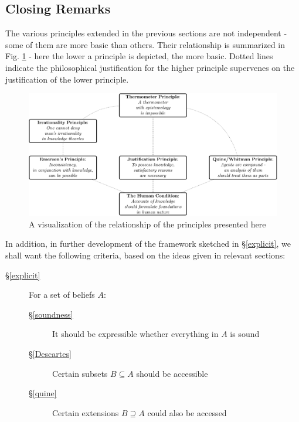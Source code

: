 \documentclass[11pt]{article}
\numberwithin{equation}{subsection}
\begin{document}
\subsection{Closing Remarks}
\label{close}
The various principles extended in the previous sections are not
independent - some of them are more basic than others.  Their
relationship is summarized in Fig. \ref{fig:principles} - here the
lower a principle is depicted, the more basic.  Dotted
lines indicate the philosophical justification for the
higher principle supervenes on the justification of the lower
principle.
\begin{figure}[ht]
\begin{center}
\includegraphics[width=\textwidth]{principles/principles.pdf} 
\end{center}
\caption{A visualization of the relationship of the principles
  presented here}
\label{fig:principles}
\end{figure}
In addition, in further development of the framework sketched in
\S\ref{explicit}, we shall want the following criteria, based on the ideas given in relevant sections:
\begin{description}
 \item[\S\ref{explicit}] 
  \item[] For a set of beliefs $A$:
\begin{description}
  \item[\S\ref{soundness}] It should be expressible whether everything in $A$ is sound 
  \item[\S\ref{Descartes}] Certain subsets $B\subseteq A$ should be accessible
  \item[\S\ref{quine}] Certain extensions $B \supseteq A$ could also be accessed
\end{description}
\end{description}
\end{document}
